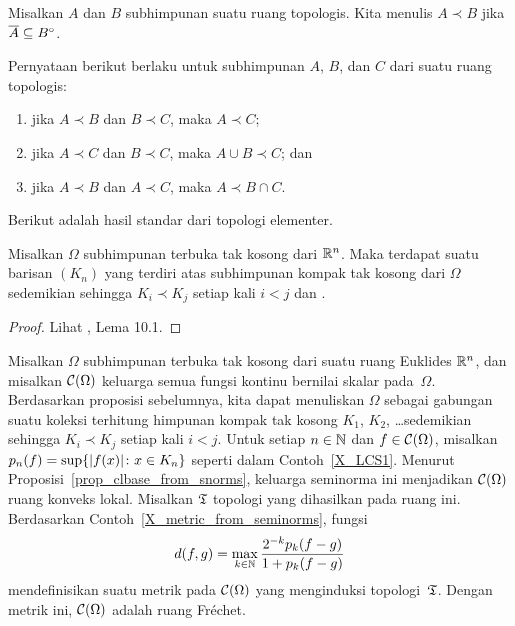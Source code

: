 \begin{notn} Misalkan $A$ dan $B$ subhimpunan suatu ruang topologis. Kita menulis
$A\prec B$ jika $\overline{A} \subseteq {B}^{\circ}$.
\end{notn}

\begin{prop} Pernyataan berikut berlaku untuk subhimpunan $A$, $B$, dan $C$ dari suatu ruang topologis:
 \begin{enumerate}
  \item[(a)] jika $A \prec B$ dan $B \prec C$, maka $A \prec C$;
  \item[(b)] jika $A \prec C$ dan $B \prec C$, maka $A \cup B \prec C$; dan
  \item[(c)] jika $A \prec B$ dan $A \prec C$, maka $A \prec B \cap C$.
 \end{enumerate}
\end{prop}

Berikut adalah hasil standar dari topologi elementer.

\begin{prop}\label{prop_open_lim_cpt} Misalkan $\Omega$ subhimpunan terbuka tak kosong dari $\mathbb{R}^n$. Maka terdapat suatu barisan
$(K_n)$ yang terdiri atas subhimpunan kompak tak kosong dari $\Omega$ sedemikian sehingga $K_i \prec K_j$ setiap kali $i < j$ dan
.
\end{prop}

\begin{proof} Lihat \cite{Treves:1967}, Lema 10.1.  \ns
\end{proof}

\begin{exam} Misalkan $\Omega$ subhimpunan terbuka tak kosong dari suatu ruang Euklides $\mathbb{R}^n$, dan misalkan $\mathcal{C}(\Omega)$ keluarga semua
fungsi kontinu bernilai skalar pada~$\Omega$. Berdasarkan proposisi sebelumnya, kita dapat menuliskan $\Omega$ sebagai gabungan suatu koleksi
terhitung himpunan kompak tak kosong $K_1$, $K_2$, \dots sedemikian sehingga $K_i \prec K_j$ setiap kali $i < j$. Untuk setiap $n \in \mathbb{N}$ dan
$f \in \mathcal{C}(\Omega)$, misalkan $p_n(f) = \sup\{\lvert f(x)\rvert\colon  x \in K_n\}$ seperti dalam Contoh~\ref{X_LCS1}. Menurut
Proposisi~\ref{prop_clbase_from_snorms}, keluarga seminorma ini menjadikan $\mathcal{C}(\Omega)$ ruang konveks lokal. Misalkan
$\mathfrak{T}$ topologi yang dihasilkan pada ruang ini. Berdasarkan Contoh~\ref{X_metric_from_seminorms}, fungsi
   \[ d(f,g) = \max_{k \in \mathbb{N}}\frac{2^{-k}p_k(f-g)}{1 + p_k(f-g)} \]
mendefinisikan suatu metrik pada $\mathcal{C}(\Omega)$ yang menginduksi topologi~$\mathfrak{T}$. Dengan metrik ini,
$\mathcal{C}(\Omega)$ adalah ruang Fr\'echet.
\end{exam}

